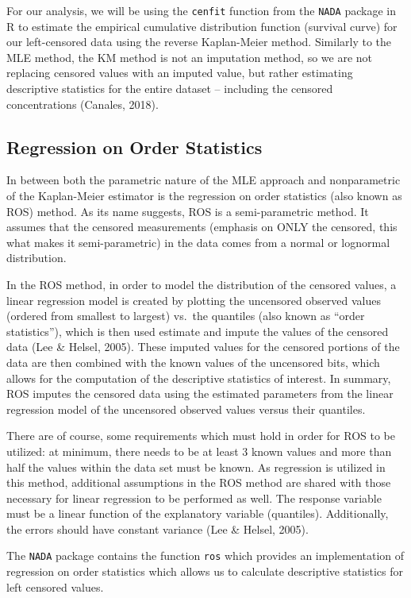\documentclass[12pt, twoside]{amherstthesis}
\begin{document}
For our analysis, we will be using the \texttt{cenfit} function from the \texttt{NADA} package in R to estimate the empirical cumulative distribution function (survival curve) for our left-censored data using the reverse Kaplan-Meier method. Similarly to the MLE method, the KM method is not an imputation method, so we are not replacing censored values with an imputed value, but rather estimating descriptive statistics for the entire dataset -- including the censored concentrations (Canales, 2018).

\hypertarget{ROS}{%
\subsection{Regression on Order Statistics}\label{ROS}}

In between both the parametric nature of the MLE approach and nonparametric of the Kaplan-Meier estimator is the regression on order statistics (also known as ROS) method. As its name suggests, ROS is a semi-parametric method. It assumes that the censored measurements (emphasis on ONLY the censored, this what makes it semi-parametric) in the data comes from a normal or lognormal distribution.

In the ROS method, in order to model the distribution of the censored values, a linear regression model is created by plotting the uncensored observed values (ordered from smallest to largest) vs.~the quantiles (also known as ``order statistics''), which is then used estimate and impute the values of the censored data (Lee \& Helsel, 2005). These imputed values for the censored portions of the data are then combined with the known values of the uncensored bits, which allows for the computation of the descriptive statistics of interest. In summary, ROS imputes the censored data using the estimated parameters from the linear regression model of the uncensored observed values versus their quantiles.

There are of course, some requirements which must hold in order for ROS to be utilized: at minimum, there needs to be at least 3 known values and more than half the values within the data set must be known. As regression is utilized in this method, additional assumptions in the ROS method are shared with those necessary for linear regression to be performed as well. The response variable must be a linear function of the explanatory variable (quantiles). Additionally, the errors should have constant variance (Lee \& Helsel, 2005).

The \texttt{NADA} package contains the function \texttt{ros} which provides an implementation of regression on order statistics which allows us to calculate descriptive statistics for left censored values.
\end{document}
